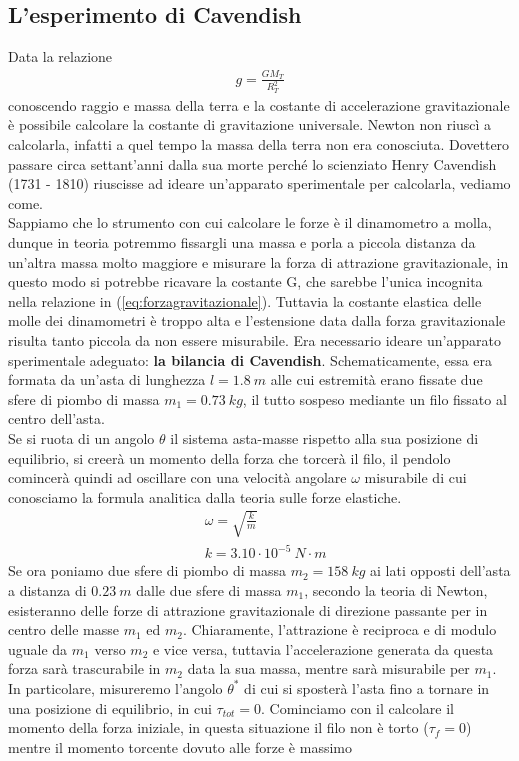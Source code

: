 \documentclass[10pt,a4paper]{article}
\begin{document}
\subsection{L'esperimento di Cavendish}
Data la relazione 
\begin{align*}
	g= \frac{G M_T}{R_T^2} 
\end{align*}
conoscendo raggio e massa della terra e la costante di accelerazione gravitazionale è possibile calcolare la costante di gravitazione universale. Newton non riuscì a calcolarla, infatti a quel tempo la massa della terra non era conosciuta. Dovettero passare circa settant'anni dalla sua morte perché lo scienziato Henry Cavendish (1731 - 1810) riuscisse ad ideare un'apparato sperimentale per calcolarla, vediamo come.\\
Sappiamo che lo strumento con cui calcolare le forze è il dinamometro a molla, dunque in teoria potremmo fissargli una massa e porla a piccola distanza da un'altra massa molto maggiore e misurare la forza di attrazione gravitazionale, in questo modo si potrebbe ricavare la costante G, che sarebbe l'unica incognita nella relazione in (\ref{eq:forzagravitazionale}). Tuttavia la costante elastica delle molle dei dinamometri è troppo alta e l'estensione data dalla forza gravitazionale risulta tanto piccola da non essere misurabile. Era necessario ideare un'apparato sperimentale adeguato: \textbf{la bilancia di Cavendish}. Schematicamente, essa era formata da un'asta di lunghezza $l = 1.8\ m$ alle cui estremità erano fissate due sfere di piombo di massa $m_1 = 0.73\ kg$, il tutto sospeso mediante un filo fissato al centro dell'asta.\\
Se si ruota di un angolo $\theta$ il sistema asta-masse rispetto alla sua posizione di equilibrio, si creerà un momento della forza che torcerà il filo, il pendolo comincerà quindi ad oscillare con una velocità angolare $\omega$ misurabile di cui conosciamo la formula analitica dalla teoria sulle forze elastiche. 
\begin{align*}
	&\omega = \sqrt{\frac{k}{m}}\\
	&k = 3.10 \cdot 10^{-5}\ N\cdot m
\end{align*}
Se ora poniamo  due sfere di piombo di massa $m_2 = 158\ kg$ ai lati opposti dell'asta a distanza di $0.23\ m$ dalle due sfere di massa $m_1$, secondo la teoria di Newton, esisteranno delle forze di attrazione gravitazionale di direzione passante per in centro delle masse $m_1$ ed $m_2$. Chiaramente, l'attrazione è reciproca e di modulo uguale da $m_1$ verso $m_2$ e vice versa, tuttavia l'accelerazione generata da questa forza sarà trascurabile in $m_2$ data la sua massa, mentre sarà misurabile per $m_1$. In particolare, misureremo l'angolo $\theta^*$ di cui si sposterà l'asta fino a tornare in una posizione di equilibrio, in cui $\tau_{tot} = 0$. Cominciamo con il calcolare il momento della forza iniziale, in questa situazione il filo non è torto ($\tau_f= 0$) mentre il momento torcente dovuto alle forze è massimo
\end{document}

